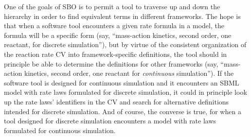 






One of the goals of SBO is to permit a tool to traverse up and
down the hierarchy in order to find equivalent terms in different
frameworks.  The hope is that when a software tool encounters a
given rate formula in a model, the formula will be a specific form
(say, ``mass-action kinetics, second order, one reactant, for
discrete simulation''), but by virtue of the consistent
organization of the reaction rate CV into framework-specific
definitions, the tool should in principle be able to determine the
definitions for other frameworks (say, ``mass-action kinetics,
second order, one reactant for \emph{continuous} simulation'').
If the software tool is designed for continuous simulation and it
encounters an SBML model with rate laws formulated for discrete
simulation, it could in principle look up the rate laws'
identifiers in the CV and search for alternative definitions
intended for discrete simulation.  And of course, the converse is
true, for when a tool designed for discrete simulation encounters
a model with rate laws formulated for continuous simulation.


